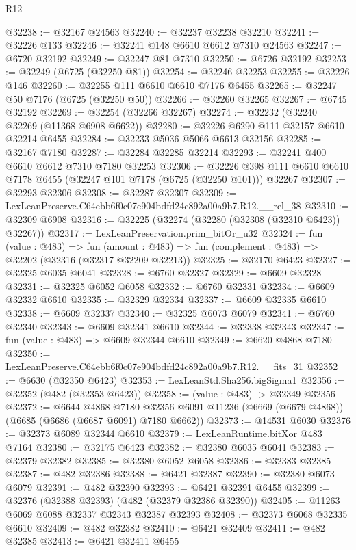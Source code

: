 \begin{lexlean}{R12}
\begin{coremodule}
@32238 := @32167 @24563
@32240 := @32237 @32238 @32210
@32241 := @32226 @133
@32246 := @32241 @148 @6610 @6612 @7310 @24563
@32247 := @6720 @32192
@32249 := @32247 @81 @7310
@32250 := @6726 @32192
@32253 := @32249 (@6725 (@32250 @81))
@32254 := @32246 @32253
@32255 := @32226 @146
@32260 := @32255 @111 @6610 @6610 @7176 @6455
@32265 := @32247 @50 @7176 (@6725 (@32250 @50))
@32266 := @32260 @32265
@32267 := @6745 @32192
@32269 := @32254 (@32266 @32267)
@32274 := @32232 (@32240 @32269 (@11368 @6908 @6622))
@32280 := @32226 @6290 @111 @32157 @6610 @32214 @6455
@32284 := @32233 @5036 @5066 @6613 @32156
@32285 := @32167 @7180
@32287 := @32284 @32285 @32214
@32293 := @32241 @400 @6610 @6612 @7310 @7180 @32253
@32306 := @32226 @398 @111 @6610 @6610 @7178 @6455 (@32247 @101 @7178 (@6725 (@32250 @101))) @32267
@32307 := @32293 @32306
@32308 := @32287 @32307
@32309 := LexLeanPreserve.C64ebb6f0c07e904bdfd24c892a00a9b7.R12.__rel_38
@32310 := @32309 @6908
@32316 := @32225 (@32274 (@32280 (@32308 (@32310 @6423)) @32267))
@32317 := LexLeanPreservation.prim_bitOr_u32
@32324 := fun (value : @483) =>
  fun (amount : @483) => fun (complement : @483) => @32202 (@32316 (@32317 @32209 @32213))
@32325 := @32170 @6423
@32327 := @32325 @6035 @6041
@32328 := @6760 @32327
@32329 := @6609 @32328
@32331 := @32325 @6052 @6058
@32332 := @6760 @32331
@32334 := @6609 @32332 @6610
@32335 := @32329 @32334
@32337 := @6609 @32335 @6610
@32338 := @6609 @32337
@32340 := @32325 @6073 @6079
@32341 := @6760 @32340
@32343 := @6609 @32341 @6610
@32344 := @32338 @32343
@32347 := fun (value : @483) => @6609 @32344 @6610
@32349 := @6620 @4868 @7180
@32350 := LexLeanPreserve.C64ebb6f0c07e904bdfd24c892a00a9b7.R12.__fits_31
@32352 := @6630 (@32350 @6423)
@32353 := LexLeanStd.Sha256.bigSigma1
@32356 := @32352 (@482 (@32353 @6423))
@32358 := (value : @483) -> @32349 @32356
@32372 := @6644
    @4868
    @7180
    @32356
    @6091
    @11236
    (@6669 (@6679 @4868))
    (@6685 (@6686 (@6687 @6091) @7180 @6662))
@32373 := @14531 @6030
@32376 := @32373 @6089 @32344 @6610
@32379 := LexLeanRuntime.bitXor @483 @7164
@32380 := @32175 @6423
@32382 := @32380 @6035 @6041
@32383 := @32379 @32382
@32385 := @32380 @6052 @6058
@32386 := @32383 @32385
@32387 := @482 @32386
@32388 := @6421 @32387
@32390 := @32380 @6073 @6079
@32391 := @482 @32390
@32393 := @6421 @32391 @6455
@32399 := @32376 (@32388 @32393) (@482 (@32379 @32386 @32390))
@32405 := @11263 @6069 @6088 @32337 @32343 @32387 @32393
@32408 := @32373 @6068 @32335 @6610
@32409 := @482 @32382
@32410 := @6421 @32409
@32411 := @482 @32385
@32413 := @6421 @32411 @6455

\end{coremodule}
\end{lexlean}
